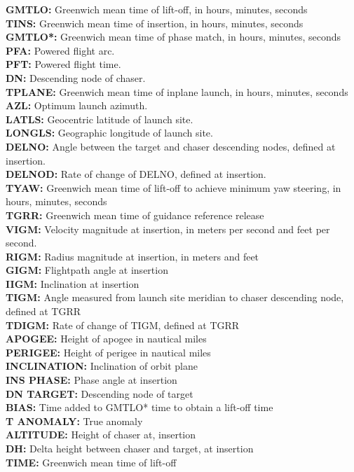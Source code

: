 \documentclass[11pt]{article} %
\begin{document}
\textbf{GMTLO:} Greenwich mean time of lift-off, in hours, minutes, seconds\\
\textbf{TINS:} Greenwich mean time of insertion, in hours, minutes, seconds\\
\textbf{GMTLO*:} Greenwich mean time of phase match, in hours, minutes, seconds\\
\textbf{PFA:} Powered flight arc.\\
\textbf{PFT:} Powered flight time.\\
\textbf{DN:} Descending node of chaser.\\
\textbf{TPLANE:} Greenwich mean time of inplane launch, in hours, minutes, seconds\\
\textbf{AZL:} Optimum launch azimuth.\\
\textbf{LATLS:} Geocentric latitude of launch site.\\
\textbf{LONGLS:} Geographic longitude of launch site.\\
\textbf{DELNO:} Angle between the target and chaser descending nodes, defined at insertion.\\
\textbf{DELNOD:} Rate of change of DELNO, defined at insertion.\\
\textbf{TYAW:} Greenwich mean time of lift-off to achieve minimum yaw steering, in hours, minutes, seconds\\
\textbf{TGRR:} Greenwich mean time of guidance reference release\\
\textbf{VIGM:} Velocity magnitude at insertion, in meters per second and feet per second.\\
\textbf{RIGM:} Radius magnitude at insertion, in meters and feet\\
\textbf{GIGM:} Flightpath angle at insertion\\
\textbf{IIGM:} Inclination at insertion\\
\textbf{TIGM:} Angle measured from launch site meridian to chaser descending node, defined at TGRR\\
\textbf{TDIGM:} Rate of change of TIGM, defined at TGRR\\
\textbf{APOGEE:} Height of apogee in nautical miles\\
\textbf{PERIGEE:} Height of perigee in nautical miles\\
\textbf{INCLINATION:} Inclination of orbit plane\\
\textbf{INS PHASE:} Phase angle at insertion\\
\textbf{DN TARGET:} Descending node of target\\
\textbf{BIAS:} Time added to GMTLO* time to obtain a lift-off time\\
\textbf{T ANOMALY:} True anomaly\\
\textbf{ALTITUDE:} Height of chaser at, insertion\\
\textbf{DH:} Delta height between chaser and target, at insertion\\
\textbf{TIME:} Greenwich mean time of lift-off\\
\end{document}
